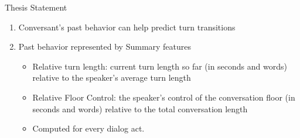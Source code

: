 \begin{frame} {Thesis Statement}
   \begin{enumerate}[<+->]\itemsep9pt
         \item Conversant's past behavior can help predict turn transitions
         \item Past behavior represented by Summary features
         \begin{itemize}
            \item Relative turn length: current turn length so far (in seconds and words) relative to the speaker's average turn length
            \item Relative Floor Control: the speaker's control of the conversation floor (in seconds and words) relative to the total conversation length
            \item Computed for every dialog act.
         \end{itemize}
     \end{enumerate}
 \end{frame} 
 